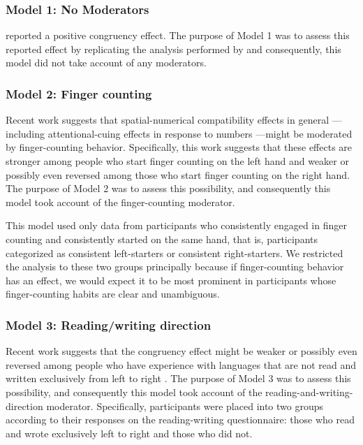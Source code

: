 \documentclass[man,floatsintext]{apa6}
\theoremstyle{definition}
\theoremstyle{definition}
\theoremstyle{definition}
\theoremstyle{remark}
\begin{document}
\subsubsection{Model 1: No Moderators}\label{model-1-no-moderators}

\textcite{Fischer:2003ju} reported a positive congruency effect. The
purpose of Model 1 was to assess this reported effect by replicating the
analysis performed by \textcite{Fischer:2003ju} and consequently, this
model did not take account of any moderators.

\subsubsection{Model 2: Finger counting}\label{model-2-finger-counting}

Recent work suggests that spatial-numerical compatibility effects in
general \autocite{Fischer:2008bv}---including attentional-cuing effects
in response to numbers \autocite{Fischer:2014kz}---might be moderated by
finger-counting behavior. Specifically, this work suggests that these
effects are stronger among people who start finger counting on the left
hand and weaker or possibly even reversed among those who start finger
counting on the right hand. The purpose of Model 2 was to assess this
possibility, and consequently this model took account of the
finger-counting moderator.

This model used only data from participants who consistently engaged in
finger counting and consistently started on the same hand, that is,
participants categorized as consistent left-starters or consistent
right-starters. We restricted the analysis to these two groups
principally because if finger-counting behavior has an effect, we would
expect it to be most prominent in participants whose finger-counting
habits are clear and unambiguous.

\subsubsection{Model 3: Reading/writing
direction}\label{model-3-readingwriting-direction}

Recent work suggests that the congruency effect might be weaker or
possibly even reversed among people who have experience with languages
that are not read and written exclusively from left to right
\autocites{Fischer:2008bv}{Shaki:2009ch}. The purpose of Model 3 was to
assess this possibility, and consequently this model took account of the
reading-and-writing-direction moderator. Specifically, participants were
placed into two groups according to their responses on the
reading-writing questionnaire: those who read and wrote exclusively left
to right and those who did not.
\end{document}
